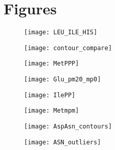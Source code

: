 \section{Figures}

\begin{figure}[h]
  \centering
  \texttt{[image: LEU\_ILE\_HIS]}
  \caption{\FigOneCaption}
    \label{fig:outcontour}
\end{figure}



\begin{figure}[h]
  \centering
  \texttt{[image: contour\_compare]}
  \caption{\FigTwoCaption}
    \label{fig:contour_compare}
\end{figure}



\begin{figure}[h]
  \centering
  \texttt{[image: MetPPP]}
  \caption{\FigThreeCaption}
    \label{fig:2bmo}
\end{figure}



\begin{figure}[h]
  \centering
  \texttt{[image: Glu\_pm20\_mp0]}
\caption{\FigFourCaption}
\label{fig:Glupm20_mp0}
\vspace{-10pt}
\end{figure}


\begin{figure}[h]
  \centering
  \texttt{[image: IlePP]}
\caption{\FigFiveCaption}
\label{fig:Ilepp}
\vspace{-10pt}
\end{figure}


\begin{figure}[h]
  \centering
  \texttt{[image: Metmpm]}
\caption{\FigSixCaption}
\label{fig:METmpm_3d43}
\vspace{-10pt}
\end{figure}


\begin{figure}[h]
  \centering
  \texttt{[image: AspAsn\_contours]}
\caption{\FigSevenCaption}
\label{fig:AspAsn}
\vspace{-10pt}
\end{figure}



\begin{figure}[h]
  \centering
  \texttt{[image: ASN\_outliers]}
\caption{\FigEightCaption}
\label{fig:AsnOutliers}
\vspace{-10pt}
\end{figure}
